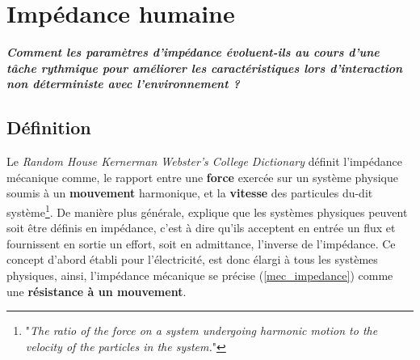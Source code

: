 \documentclass[12pt, a4paper]{article} %
\begin{document}

\tableofcontents

\newpage

\section{Impédance humaine} \label{sect_imp_humaine}

\begin{flushright}
{\color{DarkGoldenrod} \textit{\textbf{Comment les paramètres d'impédance évoluent-ils au cours d'une tâche rythmique pour améliorer les caractéristiques lors d'interaction non déterministe avec l'environnement ?}}}
\end{flushright}



\subsection{Définition}


Le \textit{Random House Kernerman Webster's College Dictionary} définit l'impédance mécanique comme, le rapport entre une \textbf{force} exercée sur un système physique soumis à un \textbf{mouvement} harmonique, et la \textbf{vitesse} des particules du-dit système\footnote{"\textit{The ratio of the force on a system undergoing harmonic motion to the velocity of the particles in the system.}"}. De manière plus générale, \cite{hogan_impedance_1985} explique que les systèmes physiques peuvent soit être définis en impédance, c'est à dire qu'ils acceptent en entrée un flux et fournissent en sortie un effort, soit en admittance, l'inverse de l'impédance. Ce concept d'abord établi pour l'électricité, est donc élargi à tous les systèmes physiques, ainsi, l'impédance mécanique se précise (\cref{mec_impedance}) comme une \textbf{résistance à un mouvement}.
\end{document}
